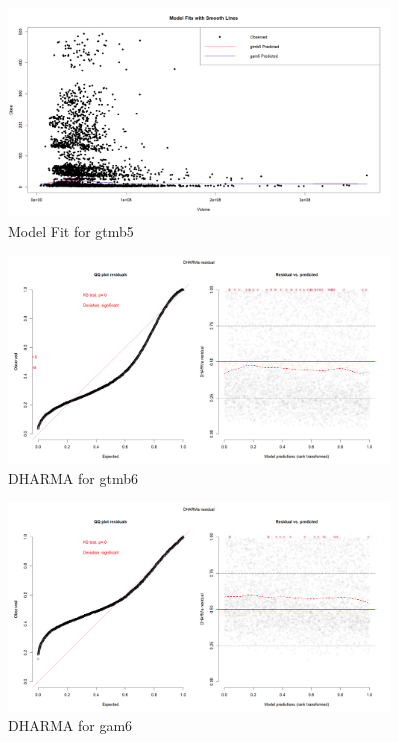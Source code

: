 \begin{figure}[h]
    \centering
    \includegraphics[width=0.9\textwidth]{visuals/model_fit_gtmb5.png}
    \caption{Model Fit for gtmb5}
    \label{fig:modfitgtmb5}
\end{figure}

\begin{figure}[h]
    \centering
    \includegraphics[width=0.9\textwidth]{visuals/DHARMa_gtmb6.png}
    \caption{DHARMA for gtmb6}
    \label{fig:dharmagtmb6}
\end{figure}

\begin{figure}[h]
    \centering
    \includegraphics[width=0.9\textwidth]{visuals/DHARMa_gam6.png}
    \caption{DHARMA for gam6}
    \label{fig:dharmagam6}
\end{figure}



